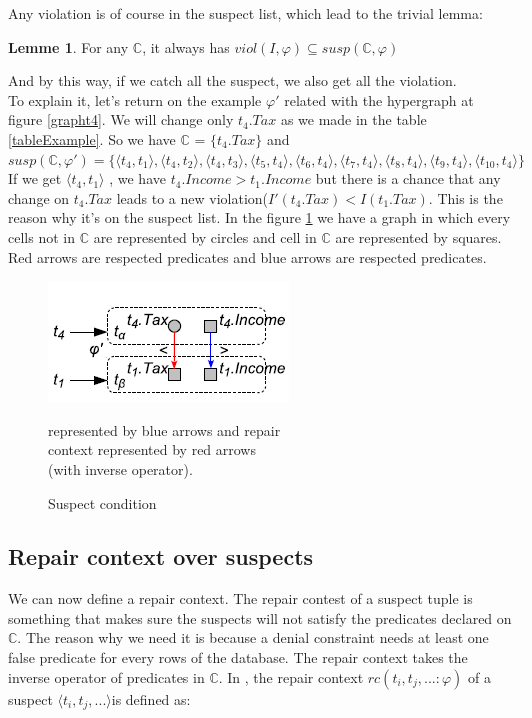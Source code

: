 \documentclass[letterpaper, 12pt]{report}
\theoremstyle{definition}
\newtheorem{mylemma}{Lemme}
\begin{document}
Any violation is of course in the suspect list, which lead to the trivial lemma:

\begin{mylemma}
	For any $\mathbb{C}$, it always has $viol(I,\varphi) \subseteq susp(\mathbb{C},\varphi)$
\end{mylemma}

And by this way, if we catch all the suspect, we also get all the violation.\\

To explain it, let's return on the example $\varphi'$ related with the hypergraph at figure \ref{grapht4}. We will change only $t_4.Tax$ as we made in the table \ref{tableExample}. So we have $\mathbb{C}$ =  $\{ t_4.Tax \}$ and $susp(\mathbb{C},\varphi') = \{\langle t_4 , t_1\rangle , 
\langle t_4 , t_2\rangle,
\langle t_4 , t_3\rangle,
\langle t_5 , t_4\rangle,
\langle t_6 , t_4\rangle,
\langle t_7 , t_4\rangle,
\langle t_8 , t_4\rangle,
\langle t_9 , t_4\rangle,
\langle t_{10} , t_4\rangle \}$ If we get $\langle t_4 , t_1\rangle$ ,   we have $t_4.Income > t_1.Income$ but there is a chance that any change on $t_4.Tax$ leads to a new violation($I'(t_4.Tax)<I(t_1.Tax) $. This is the reason why it's on the suspect list. In the figure \ref{fig3} we have a graph in which every cells not in $\mathbb{C}$ are represented by circles and cell in $\mathbb{C}$ are represented by squares. Red arrows are respected predicates and blue arrows are respected predicates.


\begin{figure}
	\centering
	\includegraphics[scale=1]{img/fig3}
	\caption{\label{fig3}Suspect condition} 
	represented by blue arrows and repair \\
	context represented by red arrows \\
	 (with inverse operator).
\end{figure}

\subsection{Repair context over suspects}

We can now define a repair context. The repair contest of a suspect tuple is something that makes sure the suspects will not satisfy the predicates declared on $\mathbb{C}$. The reason why we need it is because a denial constraint needs at least one false predicate for every rows of the database. The repair context takes the inverse operator of predicates in $\mathbb{C}$. In \cite{main}, the repair context $rc(t_i,t_j,...:\varphi)$ of a suspect $\langle t_i,t_j,... \rangle $is defined as:
\end{document}

